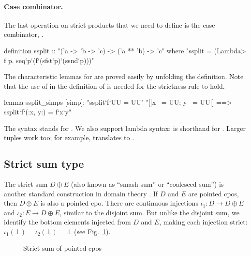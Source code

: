 \paragraph{Case combinator.} The last operation on strict products that we need to define is the case combinator, .
\begin{isacode}
definition ssplit :: "('a -> 'b -> 'c) -> ('a ** 'b) -> 'c"
  where "ssplit = (\<Lambda> f p. seq`p`(f`(sfst`p)`(ssnd`p)))"
\end{isacode}
The characteristic lemmas for  are proved easily by unfolding the definition. Note that the use of  in the definition of  is needed for the strictness rule to hold.
\begin{isacode}
lemma ssplit_simps [simp]:
  "ssplit`f`UU = UU"
  "[|x ~= UU; y ~= UU|] ==> ssplit`f`(:x, y:) = f`x`y"
\end{isacode}
The syntax  stands for . We also support lambda syntax:  is shorthand for . Larger tuples work too; for example,  translates to .


\subsection{Strict sum type}
\label{sec:holcf-ssum}

The strict sum $D \oplus E$ (also known as ``smash sum'' or ``coalesced sum'') is another standard construction in domain theory \cite{gunter90semantic, gunter92semantics, amadio+curien}. If $D$ and $E$ are pointed cpos, then $D \oplus E$ is also a pointed cpo. There are continuous injections $\iota_1 : D \to D \oplus E$ and $\iota_2 : E \to D \oplus E$, similar to the disjoint sum. But unlike the disjoint sum, we identify the bottom elements injected from $D$ and $E$, making each injection strict: $\iota_1(\bot) = \iota_2(\bot) = \bot$ (see Fig.~\ref{fig:holcf-strict-sum}).

\begin{figure}
\centering
{}
\caption{Strict sum of pointed cpos}
\label{fig:holcf-strict-sum}
\end{figure}

